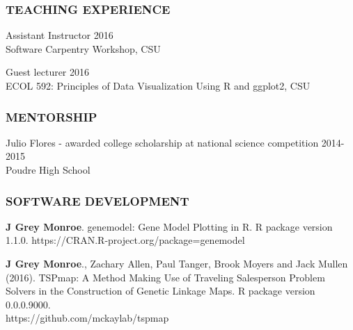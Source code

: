 \documentclass[12pt,english]{article}
\begin{document}

\subsubsection*{TEACHING EXPERIENCE}
\vspace{-0.5ex}\par

\hspace*{1.0em} Assistant Instructor
\hfill 
2016\\
\hspace*{2.0em} Software Carpentry Workshop, CSU
\par
\vspace{0.5em}
\hspace*{1.0em} Guest lecturer
\hfill 
2016\\
\hspace*{2.0em} ECOL 592: Principles of Data Visualization Using R and ggplot2, CSU
\vspace{0.5em}\par


\subsubsection*{MENTORSHIP}
\vspace{-0.5ex}\par

\hspace*{1.0em} Julio Flores - awarded college scholarship at national science competition 
\hfill 
2014-2015\\
\hspace*{2.0em} Poudre High School


\subsubsection*{SOFTWARE DEVELOPMENT}
\vspace{-0.5ex}

\begin{hangparas}{.5in}{1}

\hspace{1em}\textbf{J Grey Monroe}. genemodel: Gene Model Plotting in R. R package version 1.1.0.
  https://CRAN.R-project.org/package=genemodel
\vspace{0.5ex}\par
\hspace{1em}\textbf{J Grey Monroe}., Zachary Allen, Paul Tanger, Brook Moyers and Jack Mullen (2016). TSPmap: A Method Making Use of Traveling Salesperson Problem Solvers in the Construction of Genetic Linkage Maps. R package version 0.0.0.9000. \\https://github.com/mckaylab/tspmap

\end{hangparas}
\end{document}

